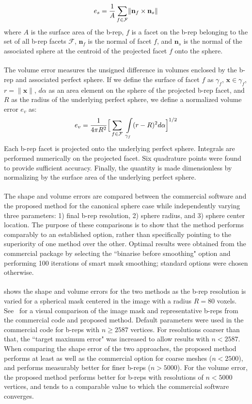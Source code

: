 \begin{equation} 
	e_s = \frac{1}{A} \sum \limits_{f\in\mathcal{F}} \lVert {\bf n}_f \times {\bf n}_s \rVert
\end{equation}
where $A$ is the surface area of the b-rep, $f$ is a facet on the b-rep belonging to the set of all b-rep facets $\mathcal{F}$, ${\bm n}_f$ is the normal of facet $f$, and ${\bm n}_s$ is the normal of the associated sphere at the centroid of the projected facet $f$ onto the sphere. \\ \\
%
The volume error measures the unsigned difference in volumes enclosed by the b-rep and associated perfect sphere. If we define the surface of facet $f$ as $\gamma_f$,  ${\bm x} \in \gamma_f$, $r = \lVert {\bm x} \rVert$, $d\alpha$ as an area element on the sphere of the projected b-rep facet, and $R$ as the radius of the underlying perfect sphere, we define a normalized volume error $e_v$ as:
\begin{equation}
	e_v = \frac{1}{4\pi R^2} \Big[\sum \limits_{f \in \mathcal{F}\textsl{}} \ \int \limits_{\gamma_f} (r - R)^2 d\alpha \Big]^{1/2}
\end{equation}
Each b-rep facet is projected onto the underlying perfect sphere. Integrals are performed numerically on the projected facet. Six quadrature points were found to provide sufficient accuracy. Finally, the quantity is made dimensionless by normalizing by the surface area of the underlying perfect sphere.
\\ \\
%
The shape and volume errors are compared between the commercial software and the proposed method for the canonical sphere case while independently varying three parameters: 1) final b-rep resolution, 2) sphere radius, and 3) sphere center location. The purpose of these comparisons is to show that the method performs comparably to an established option, rather than specifically pointing to the superiority of one method over the other. Optimal results were obtained from the commercial package by selecting the ``binarise before smoothing" option and performing 100 iterations of smart mask smoothing; standard options were chosen otherwise. \\ \\
%
 shows the shape and volume errors for the two methods as the b-rep resolution is varied for a spherical mask centered in the image with a radius $R = 80$ voxels. See~ for a visual comparison of the image mask and representative b-reps from the commercial code and proposed method. Default parameters were used in the commercial code for b-reps with $n \ge 2587$ vertices. For resolutions coarser than that, the ``target maximum error" was increased to allow results with $n < 2587$. When comparing the shape error of the two approaches, the proposed method performs at least as well as the commercial option for coarse meshes ($n < 2500$), and performs measurably better for finer b-reps ($n > 5000$). For the volume error, the proposed method performs better for b-reps with resolutions of $n < 5000$ vertices, and tends to a comparable value to which the commercial software converges.\\ \\
